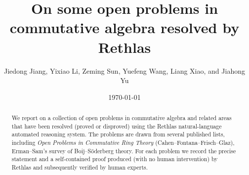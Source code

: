 \documentclass[11pt,reqno]{amsart}
\numberwithin{equation}{section}
\theoremstyle{definition}
\begin{document}
\title[On some open problems in commutative algebra resolved by Rethlas]{On some open problems in commutative algebra resolved by Rethlas}

\author{Jiedong Jiang, Yixiao Li, Zeming Sun, Yuefeng Wang, Liang Xiao, and Jiahong Yu}

\address{Jiedong Jiang, Westlake Institute for Advanced Study, Westlake University, No. 600 Dunyu Road, Sandun town, Xihu district, Hangzhou, Zhejiang, 310030, China.}

\address{Yixiao Li, Beijing International Center for Mathematical Research, Peking University, No.~5 Yiheyuan Road, Haidian District, Beijing 100871, China.}

\address{Zeming Sun, Beijing International Center for Mathematical Research, Peking University, No.~5 Yiheyuan Road, Haidian District, Beijing 100871, China.}

\address{Yuefeng Wang, Beijing International Center for Mathematical Research, Peking University, No.~5 Yiheyuan Road, Haidian District, Beijing 100871, China.}

\address{Liang Xiao, New Cornerstone Science Laboratory, School of Mathematical Sciences, Peking University, No.~5 Yi He Yuan Road, Haidian District, Beijing, 100871, China.}

\address{Jiahong Yu, Morningside Center of Mathematics, Chinese Academy of Sciences, No.~55, Zhongguancun East Road, Beijing, 100190, China.}



\date{\today}

\begin{abstract}
We report on a collection of open problems in commutative algebra and related areas
that have been resolved (proved or disproved) using the Rethlas
natural-language automated reasoning system. The problems are drawn from several
published lists, including \emph{Open Problems in Commutative Ring Theory}
(Cahen--Fontana--Frisch--Glaz), Erman--Sam's survey of Boij--S\"oderberg
theory.
For each problem we record the precise statement and a
self-contained proof produced (with no human intervention) by Rethlas
and subsequently verified by human experts.
\end{abstract}
\end{document}
